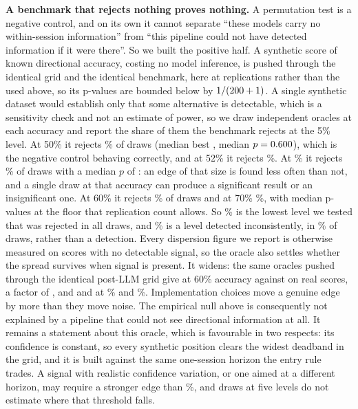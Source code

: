 \documentclass[sigconf]{acmart}
\begin{document}
\textbf{A benchmark that rejects nothing proves nothing.} A permutation test is a negative control,
and on its own it cannot separate ``these models carry no within-session information'' from ``this
pipeline could not have detected information if it were there''. So we built the positive half.
A synthetic score of known directional accuracy, costing no model inference, is pushed through the
identical grid and the identical benchmark, here at \PowerReps{} replications rather than the
\PermReps{} used above, so its p-values are bounded below by $1/(200{}+1)$. A single
synthetic dataset would establish only that some alternative is detectable, which is a sensitivity
check and not an estimate of power, so we draw \PowerDraws{} independent oracles at each accuracy
and report the share of them the benchmark rejects at the 5\% level. At 50\% it rejects
\OracleFiftyRej{}\% of draws (median best \OracleFiftyBest{}, median $p=0.600{}$), which is
the negative control behaving correctly, and at 52\% it rejects \OracleFiftytwoRej{}\%. At
\UnreliableAcc{}\% it rejects \OracleFiftyfiveRej{}\% of draws with a median $p$ of
\OracleFiftyfiveP{}: an edge of that size is found less often than not, and a single draw at that
accuracy can produce a significant result or an insignificant one. At 60\% it rejects
\OracleSixtyRej{}\% of draws and at 70\% \OracleSeventyRej{}\%, with median p-values at the floor
that replication count allows. So \MinDetectAcc{}\% is the lowest level we tested that was rejected
in all \PowerDraws{} draws, and \UnreliableAcc{}\% is a level detected inconsistently, in
\OracleFiftyfiveRej{}\% of draws, rather than a detection.
Every dispersion figure we report is otherwise measured on scores with no detectable signal, so the
oracle also settles whether the spread survives when signal is present. It widens: the same
\OracleDispDraws{} oracles pushed through the identical post-LLM grid give \OracleSDSixty{} at 60\%
accuracy against \ArmSD{} on real scores, a factor of \OracleSDRatio{}, and \OracleSDFiftyfive{}
and \OracleSDSeventy{} at \OracleAccLow{}\% and \OracleAccHigh{}\%. Implementation choices move a
genuine edge by more than they move noise.
The empirical null above is consequently not explained by a pipeline that could not see directional
information at all. It remains a statement about this oracle, which is favourable in two respects:
its confidence is constant, so every synthetic position clears the widest deadband in the grid, and
it is built against the same one-session horizon the entry rule trades. A signal with realistic
confidence variation, or one aimed at a different horizon, may require a stronger edge than
\MinDetectAcc{}\%, and \PowerDraws{} draws at five levels do not estimate where that threshold falls.
\end{document}
